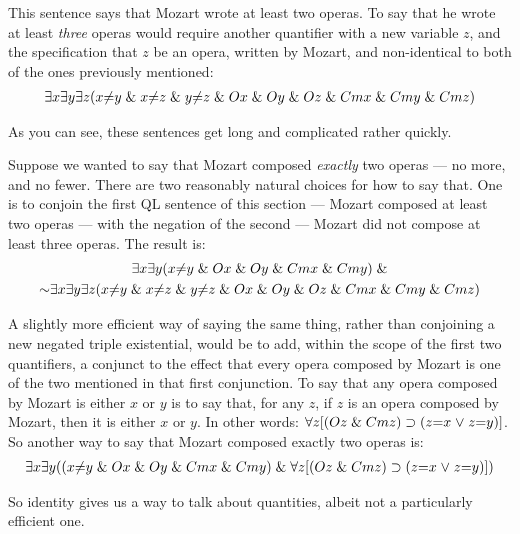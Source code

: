This sentence says that Mozart wrote at least two operas. To say that he wrote at least \emph{three} operas would require another quantifier with a new variable $z$, and the specification that $z$ be an opera, written by Mozart, and non-identical to both of the ones previously mentioned:
\begin{multline*}
\exists x \exists y \exists z (x {\neq} y \mathrel\& x {\neq} z \mathrel\& y {\neq} z \mathrel\& 
Ox \mathrel\& Oy \mathrel\& Oz \mathrel\& Cmx \mathrel\& Cmy \mathrel\& Cmz)
\end{multline*}

As you can see, these sentences get long and complicated rather quickly.

Suppose we wanted to say that Mozart composed \emph{exactly} two operas --- no more, and no fewer. There are two reasonably natural choices for how to say that. One is to conjoin the first QL sentence of this section --- Mozart composed at least two operas --- with the negation of the second --- Mozart did not compose at least three operas. The result is:
\begin{multline*}
\qt{\exists}{x} \qt{\exists}{y} (x {\neq} y \eand Ox \eand Oy \eand Cmx \eand Cmy) \eand \\ \enot \qt{\exists}{x} \qt{\exists}{y} \qt{\exists}{z} (x {\neq} y \eand x {\neq} z \eand y {\neq} z \eand Ox \eand Oy \eand Oz \eand Cmx \eand Cmy \eand Cmz)
\end{multline*}

A slightly more efficient way of saying the same thing, rather than conjoining a new negated triple existential, would be to add, within the scope of the first two quantifiers, a conjunct to the effect that every opera composed by Mozart is one of the two mentioned in that first conjunction. To say that any opera composed by Mozart is either $x$ or $y$ is to say that, for any $z$, if $z$ is an opera composed by Mozart, then it is either $x$ or $y$. In other words: $\forall z [(Oz \mathrel\& Cmz) \supset (z{=}x \mkern1mu\vee\mkern1mu z{=}y)]$. So another way to say that Mozart composed exactly two operas is:
\begin{multline*}
\exists x \exists y ((x {\neq} y  \mathrel\&  Ox \mathrel\& Oy \mathrel\&  Cmx \mathrel\& Cmy) \mathrel\& \forall z [(Oz \mathrel\& Cmz) \supset (z{=}x \mkern1mu\vee\mkern1mu z{=}y)])
\end{multline*}

So identity gives us a way to talk about quantities, albeit not a particularly efficient one.



